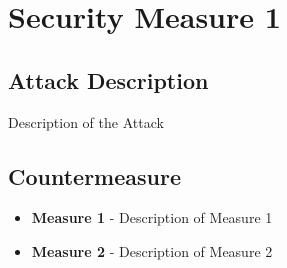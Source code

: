 \section{Security Measure 1}

\subsection{Attack Description}
Description of the Attack

\subsection{Countermeasure}
\begin{itemize}
\item \textbf{Measure 1} - Description of Measure 1
\item \textbf{Measure 2} - Description of Measure 2
\end{itemize}